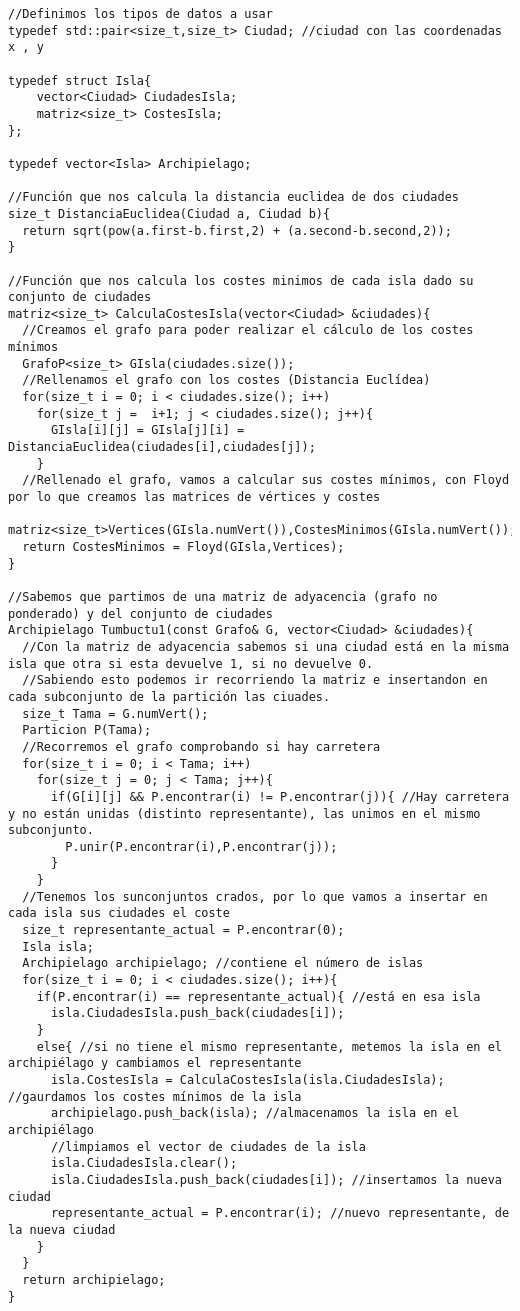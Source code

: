 \begin{verbatim}
//Definimos los tipos de datos a usar
typedef std::pair<size_t,size_t> Ciudad; //ciudad con las coordenadas x , y

typedef struct Isla{
    vector<Ciudad> CiudadesIsla;
    matriz<size_t> CostesIsla;
};

typedef vector<Isla> Archipielago;

//Función que nos calcula la distancia euclidea de dos ciudades
size_t DistanciaEuclidea(Ciudad a, Ciudad b){
  return sqrt(pow(a.first-b.first,2) + (a.second-b.second,2));
}

//Función que nos calcula los costes minimos de cada isla dado su conjunto de ciudades
matriz<size_t> CalculaCostesIsla(vector<Ciudad> &ciudades){
  //Creamos el grafo para poder realizar el cálculo de los costes mínimos
  GrafoP<size_t> GIsla(ciudades.size());
  //Rellenamos el grafo con los costes (Distancia Euclídea)
  for(size_t i = 0; i < ciudades.size(); i++)
    for(size_t j =  i+1; j < ciudades.size(); j++){
      GIsla[i][j] = GIsla[j][i] = DistanciaEuclidea(ciudades[i],ciudades[j]);
    }
  //Rellenado el grafo, vamos a calcular sus costes mínimos, con Floyd por lo que creamos las matrices de vértices y costes
  matriz<size_t>Vertices(GIsla.numVert()),CostesMinimos(GIsla.numVert());
  return CostesMinimos = Floyd(GIsla,Vertices);
}

//Sabemos que partimos de una matriz de adyacencia (grafo no ponderado) y del conjunto de ciudades
Archipielago Tumbuctu1(const Grafo& G, vector<Ciudad> &ciudades){
  //Con la matriz de adyacencia sabemos si una ciudad está en la misma isla que otra si esta devuelve 1, si no devuelve 0.
  //Sabiendo esto podemos ir recorriendo la matriz e insertandon en cada subconjunto de la partición las ciuades.
  size_t Tama = G.numVert();
  Particion P(Tama);
  //Recorremos el grafo comprobando si hay carretera
  for(size_t i = 0; i < Tama; i++)
    for(size_t j = 0; j < Tama; j++){
      if(G[i][j] && P.encontrar(i) != P.encontrar(j)){ //Hay carretera y no están unidas (distinto representante), las unimos en el mismo subconjunto.
        P.unir(P.encontrar(i),P.encontrar(j));
      }
    }
  //Tenemos los sunconjuntos crados, por lo que vamos a insertar en cada isla sus ciudades el coste
  size_t representante_actual = P.encontrar(0);
  Isla isla;
  Archipielago archipielago; //contiene el número de islas
  for(size_t i = 0; i < ciudades.size(); i++){
    if(P.encontrar(i) == representante_actual){ //está en esa isla
      isla.CiudadesIsla.push_back(ciudades[i]);
    }
    else{ //si no tiene el mismo representante, metemos la isla en el archipiélago y cambiamos el representante
      isla.CostesIsla = CalculaCostesIsla(isla.CiudadesIsla); //gaurdamos los costes mínimos de la isla
      archipielago.push_back(isla); //almacenamos la isla en el archipiélago
      //limpiamos el vector de ciudades de la isla
      isla.CiudadesIsla.clear();
      isla.CiudadesIsla.push_back(ciudades[i]); //insertamos la nueva ciudad
      representante_actual = P.encontrar(i); //nuevo representante, de la nueva ciudad      
    }
  }
  return archipielago;
}
\end{verbatim}

